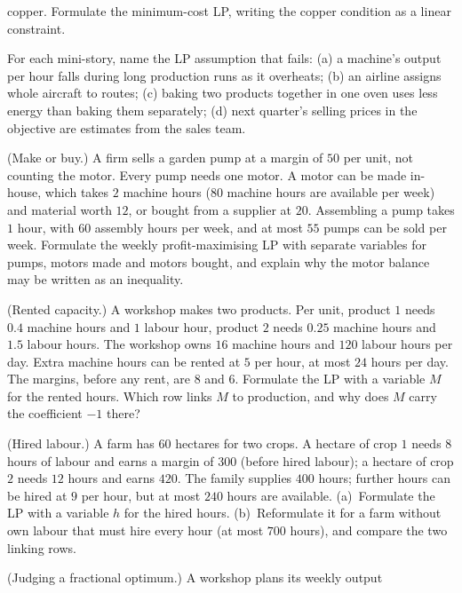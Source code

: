 \begin{problems}
        copper. Formulate the minimum-cost LP, writing the copper
        condition as a linear constraint.
  \item For each mini-story, name the LP assumption that fails:
        (a) a machine's output per hour falls during long production runs
        as it overheats;
        (b) an airline assigns whole aircraft to routes;
        (c) baking two products together in one oven uses less energy
        than baking them separately;
        (d) next quarter's selling prices in the objective are estimates
        from the sales team.
  \item (Make or buy.) A firm sells a garden pump at a margin of $50$ per
        unit, not counting the motor. Every pump needs one motor. A motor
        can be made in-house, which takes $2$ machine hours ($80$ machine
        hours are available per week) and material worth $12$, or bought
        from a supplier at $20$. Assembling a pump takes $1$ hour, with
        $60$ assembly hours per week, and at most $55$ pumps can be sold
        per week. Formulate the weekly profit-maximising LP with separate
        variables for pumps, motors made and motors bought, and explain
        why the motor balance may be written as an inequality.
  \item (Rented capacity.) A workshop makes two products. Per unit,
        product $1$ needs $0.4$ machine hours and $1$ labour hour, product
        $2$ needs $0.25$ machine hours and $1.5$ labour hours. The workshop
        owns $16$ machine hours and $120$ labour hours per day. Extra
        machine hours can be rented at $5$ per hour, at most $24$ hours per
        day. The margins, before any rent, are $8$ and $6$. Formulate the
        LP with a variable $M$ for the rented hours. Which row links $M$
        to production, and why does $M$ carry the coefficient $-1$ there?
  \item (Hired labour.) A farm has $60$ hectares for two crops. A hectare
        of crop $1$ needs $8$ hours of labour and earns a margin of $300$
        (before hired labour); a hectare of crop $2$ needs $12$ hours and
        earns $420$. The family supplies $400$ hours; further hours can be
        hired at $9$ per hour, but at most $240$ hours are available.
        (a)~Formulate the LP with a variable $h$ for the hired hours.
        (b)~Reformulate it for a farm without own labour that must hire
        every hour (at most $700$ hours), and compare the two linking
        rows.
  \item (Judging a fractional optimum.) A workshop plans its weekly output

\end{problems}
